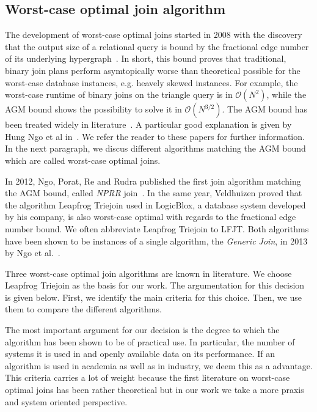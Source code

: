 \subsection{Worst-case optimal join algorithm}\label{subsec:worst-case-optimal-join-algorithm}
The development of worst-case optimal joins started in 2008 with the discovery that the output size of a relational query
is bound by the fractional edge number of its underlying hypergraph~\cite{agm}.
In short, this bound proves that traditional, binary join plans perform asymtopically worse than theoretical possible
for the worst-case database instances, e.g. heavely skewed instances.
For example, the worst-case runtime of binary joins on the triangle query is in $\mathcal{O} (N^2)$, while the AGM bound
shows the possibility to solve it in $\mathcal{O} (N^{3/2})$.
The AGM bound has been treated widely in literature~\cite{skew-strikes-back,andreas,agm}.
A particular good explanation is given by Hung Ngo et al in~\cite{skew-strikes-back}.
We refer the reader to these papers for further information.
In the next paragraph, we discus different algorithms matching the AGM bound which are called worst-case optimal joins.

In 2012, Ngo, Porat, Re and Rudra published the first join algorithm matching the AGM bound, called \textit{NPRR} join~\cite{nprr}.
In the same year, Veldhuizen proved that the algorithm Leapfrog Triejoin used in LogicBlox,
a database system developed by his company, is also worst-case optimal with regards to the fractional edge number bound.
We often abbreviate Leapfrog Triejoin to \textsc{LFJT}.
Both algorithms have been shown to be instances of a single algorithm, the \textit{Generic Join}, in 2013 by Ngo et al.~\cite{skew-strikes-back}.

Three worst-case optimal join algorithms are known in literature.
We choose Leapfrog Triejoin as the basis for our work.
The argumentation for this decision is given below.
First, we identify the main criteria for this choice.
Then, we use them to compare the different algorithms.

The most important argument for our decision is the degree to which the algorithm has been shown
to be of practical use.
In particular, the number of systems it is used in and openly available data on its performance.
If an algorithm is used in academia as well as in industry, we deem this as a advantage.
This criteria carries a lot of weight because the first literature on worst-case optimal joins
has been rather theoretical but in our work we take a more praxis and system oriented perspective.

